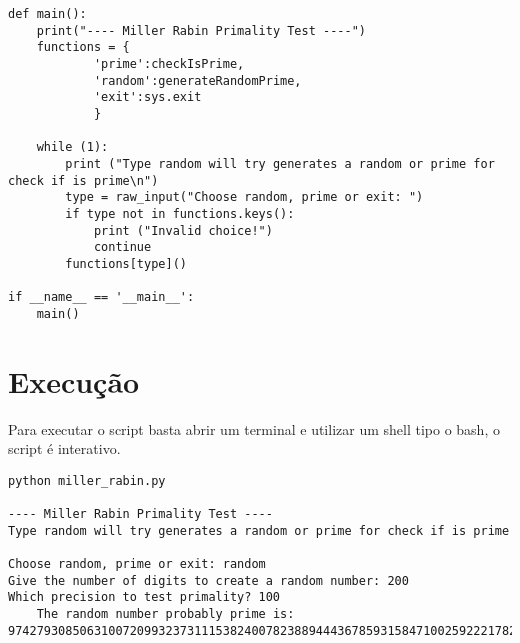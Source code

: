 \documentclass[a4paper,11pt]{article}
\theoremstyle{mytheor}
\begin{document}
\begin{lstlisting}[label={list:first},caption=Miller Rabin prime test em Python.]
def main():
    print("---- Miller Rabin Primality Test ----")
    functions = {
            'prime':checkIsPrime,
            'random':generateRandomPrime,
            'exit':sys.exit
            }
    
    while (1):
        print ("Type random will try generates a random or prime for check if is prime\n")
        type = raw_input("Choose random, prime or exit: ")
        if type not in functions.keys():
            print ("Invalid choice!")
            continue
        functions[type]()

if __name__ == '__main__':
    main()
\end{lstlisting}

\section*{Execução}

Para executar o script basta abrir um terminal e utilizar um shell tipo o bash, o script é interativo.

\begin{lstlisting}[label={list:second},caption=Executando o script.]
python miller_rabin.py

---- Miller Rabin Primality Test ----
Type random will try generates a random or prime for check if is prime

Choose random, prime or exit: random
Give the number of digits to create a random number: 200
Which precision to test primality? 100
    The random number probably prime is:  97427930850631007209932373111538240078238894443678593158471002592221782922131726207485466701550329045372339100590141645341390171807569749429398142665275255472653515797800907674306966481588454740955683
\end{lstlisting}
\end{document}
